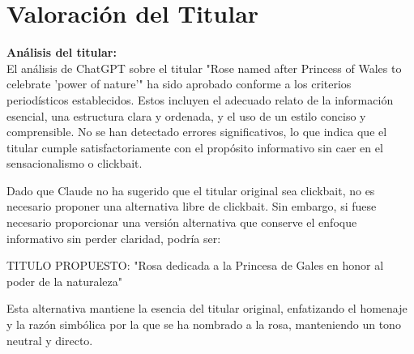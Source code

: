 \documentclass[10pt,a4paper]{article}
\begin{document}
\section*{Valoración del Titular}
        \textbf{Análisis del titular:} \\ 
        El an\'{a}lisis de ChatGPT sobre el titular "Rose named after Princess of Wales to celebrate 'power of nature'" ha sido aprobado conforme a los criterios period\'{i}sticos establecidos. Estos incluyen el adecuado relato de la informaci\'{o}n esencial, una estructura clara y ordenada, y el uso de un estilo conciso y comprensible. No se han detectado errores significativos, lo que indica que el titular cumple satisfactoriamente con el prop\'{o}sito informativo sin caer en el sensacionalismo o clickbait.
\par\medskip
Dado que Claude no ha sugerido que el titular original sea clickbait, no es necesario proponer una alternativa libre de clickbait. Sin embargo, si fuese necesario proporcionar una versi\'{o}n alternativa que conserve el enfoque informativo sin perder claridad, podr\'{i}a ser:
\par\medskip
TITULO PROPUESTO: "Rosa dedicada a la Princesa de Gales en honor al poder de la naturaleza"
\par\medskip
Esta alternativa mantiene la esencia del titular original, enfatizando el homenaje y la raz\'{o}n simb\'{o}lica por la que se ha nombrado a la rosa, manteniendo un tono neutral y directo.
        \vspace{1em}
\vspace{1em}

\end{document}
